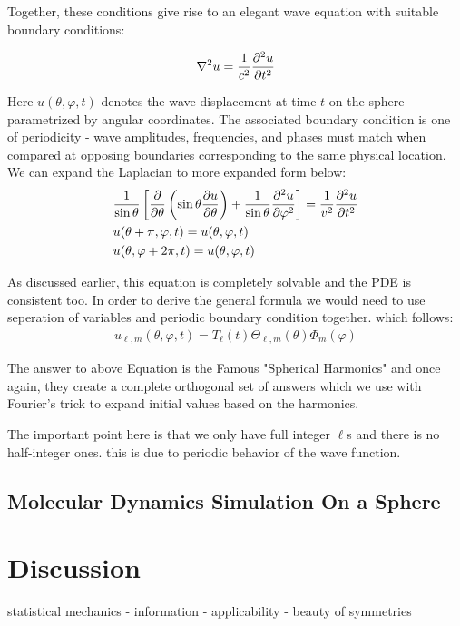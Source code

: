 \documentclass[final,5p,times,twocolumn,authoryear]{elsarticle}
\begin{document}
Together, these conditions give rise to an elegant wave equation with suitable boundary conditions:

\begin{equation*}
	\nabla^2 u = \frac{1}{c^2}\pdv[order={2}]{u}{t} 
\end{equation*}

Here $u(\theta,\varphi,t)$ denotes the wave displacement at time $t$ on the sphere parametrized by angular coordinates. The associated boundary condition is one of periodicity - wave amplitudes, frequencies, and phases must match when compared at opposing boundaries corresponding to the same physical location. We can expand the Laplacian to more expanded form below:
\begin{equation}
	\begin{aligned}
		&\frac{1}{\sin\theta}\left[\pdv{}{\theta}\left(\sin\theta\pdv{u}{\theta}\right) +\frac{1}{\sin\theta}\pdv[ord={2}]{u}{\varphi}\right] =  \frac{1}{v^2}\pdv[order={2}]{u}{t} \\
		&u(\theta+\pi,\varphi,t) = u(\theta,\varphi,t)\\
		&u(\theta,\varphi+2\pi,t) = u(\theta,\varphi,t)
	\end{aligned}
\end{equation}

As discussed earlier, this equation is completely solvable and the PDE is consistent too. In order to derive the general formula we would need to use seperation of variables and periodic boundary condition together. which follows:
\begin{align*}
	 u_{\ell,m}(\theta,\varphi,t) = T_\ell(t) \Theta_{\ell,m}(\theta) \Phi_m(\varphi) 
\end{align*}

The answer to above Equation is the Famous "Spherical Harmonics" and once again, they create a complete orthogonal set of answers which we use with Fourier's trick to expand initial values based on the harmonics.

The important point here is that we only have full integer $\ell$s and there is no half-integer ones. this is due to periodic behavior of the wave function.


\subsection{Molecular Dynamics Simulation On a Sphere}


\section{Discussion}
statistical mechanics - information - applicability - beauty of symmetries
\end{document}

